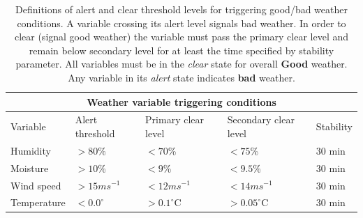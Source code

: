 \begin{table}[htbp]
\begin{center}
\begin{tabular}{lllll}
\toprule
\multicolumn{5}{c}{Weather variable triggering conditions} \\
\midrule
Variable & Alert threshold & Primary clear level & Secondary clear level & Stability \\
\midrule
Humidity    &  $> 80$\%        & $< 70$\%         & $< 75$\%          & 30 min\\
Moisture    &  $> 10$\%        & $< 9$\%          & $< 9.5$\%         & 30 min\\
Wind speed  &  $> 15ms^{-1}$   & $< 12ms^{-1}$    & $< 14ms^{-1}$     & 30 min\\
Temperature &  $< 0.0^{\circ}$ & $> 0.1^{\circ}$C & $> 0.05^{\circ}$C & 30 min\\
\bottomrule
\end{tabular}
\end{center}
\caption{Definitions of alert and clear threshold levels for triggering good/bad weather conditions. A variable crossing its alert level signals bad weather. In order to clear (signal good weather) the variable must pass the primary clear level and remain below secondary level for at least the time specified by stability parameter. All variables must be in the \emph{clear} state for overall {\bf Good} weather. Any variable in its \emph{alert} state indicates {\bf bad} weather.}
\label{tab:rcs_weather_rules}
\end{table}

